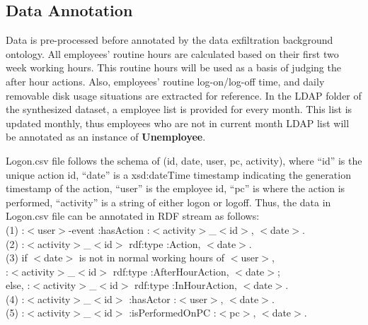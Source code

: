 \subsection{Data Annotation}
Data is pre-processed before annotated by the data exfiltration background ontology. 
All employees' routine hours are calculated based on their first two week working hours. 
This routine hours will be used as a basis of judging the after hour actions. 
Also, employees' routine log-on/log-off time, and daily removable disk usage situations are extracted for reference. 
In the LDAP folder of the synthesized dataset, a employee list is provided for every month.
This list is updated monthly, thus employees who are not in current month LDAP list will be annotated as an instance of \textbf{Unemployee}.

Logon.csv file follows the schema of (id, date, user, pc, activity), where ``id'' is the unique action id, ``date'' is a xsd:dateTime timestamp indicating the generation timestamp of the action, ``user'' is the employee id, ``pc'' is where the action is performed, ``activity'' is a string of either logon or logoff. 
Thus, the data in Logon.csv file can be annotated in RDF stream as follows: \\
(1) :$<$user$>$-event :hasAction :$<$activity$>$\_$<$id$>$, $<$date$>$. \\
(2) :$<$activity$>$\_$<$id$>$ rdf:type :Action, $<$date$>$. \\
(3) if $<$date$>$ is not in normal working hours of $<$user$>$, \\
:$<$activity$>$\_$<$id$>$ rdf:type :AfterHourAction, $<$date$>$; \\ 
else, :$<$activity$>$\_$<$id$>$ rdf:type :InHourAction, $<$date$>$. \\
(4) :$<$activity$>$\_$<$id$>$ :hasActor :$<$user$>$, $<$date$>$.  \\
(5) :$<$activity$>$\_$<$id$>$ :isPerformedOnPC :$<$pc$>$, $<$date$>$. 

